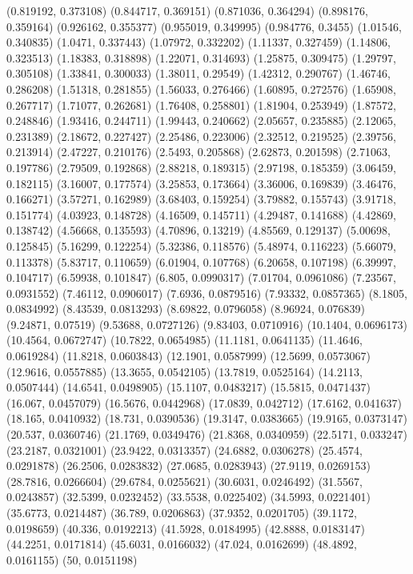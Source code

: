 {(0.819192, 0.373108)
(0.844717, 0.369151)
(0.871036, 0.364294)
(0.898176, 0.359164)
(0.926162, 0.355377)
(0.955019, 0.349995)
(0.984776, 0.3455)
(1.01546, 0.340835)
(1.0471, 0.337443)
(1.07972, 0.332202)
(1.11337, 0.327459)
(1.14806, 0.323513)
(1.18383, 0.318898)
(1.22071, 0.314693)
(1.25875, 0.309475)
(1.29797, 0.305108)
(1.33841, 0.300033)
(1.38011, 0.29549)
(1.42312, 0.290767)
(1.46746, 0.286208)
(1.51318, 0.281855)
(1.56033, 0.276466)
(1.60895, 0.272576)
(1.65908, 0.267717)
(1.71077, 0.262681)
(1.76408, 0.258801)
(1.81904, 0.253949)
(1.87572, 0.248846)
(1.93416, 0.244711)
(1.99443, 0.240662)
(2.05657, 0.235885)
(2.12065, 0.231389)
(2.18672, 0.227427)
(2.25486, 0.223006)
(2.32512, 0.219525)
(2.39756, 0.213914)
(2.47227, 0.210176)
(2.5493, 0.205868)
(2.62873, 0.201598)
(2.71063, 0.197786)
(2.79509, 0.192868)
(2.88218, 0.189315)
(2.97198, 0.185359)
(3.06459, 0.182115)
(3.16007, 0.177574)
(3.25853, 0.173664)
(3.36006, 0.169839)
(3.46476, 0.166271)
(3.57271, 0.162989)
(3.68403, 0.159254)
(3.79882, 0.155743)
(3.91718, 0.151774)
(4.03923, 0.148728)
(4.16509, 0.145711)
(4.29487, 0.141688)
(4.42869, 0.138742)
(4.56668, 0.135593)
(4.70896, 0.13219)
(4.85569, 0.129137)
(5.00698, 0.125845)
(5.16299, 0.122254)
(5.32386, 0.118576)
(5.48974, 0.116223)
(5.66079, 0.113378)
(5.83717, 0.110659)
(6.01904, 0.107768)
(6.20658, 0.107198)
(6.39997, 0.104717)
(6.59938, 0.101847)
(6.805, 0.0990317)
(7.01704, 0.0961086)
(7.23567, 0.0931552)
(7.46112, 0.0906017)
(7.6936, 0.0879516)
(7.93332, 0.0857365)
(8.1805, 0.0834992)
(8.43539, 0.0813293)
(8.69822, 0.0796058)
(8.96924, 0.076839)
(9.24871, 0.07519)
(9.53688, 0.0727126)
(9.83403, 0.0710916)
(10.1404, 0.0696173)
(10.4564, 0.0672747)
(10.7822, 0.0654985)
(11.1181, 0.0641135)
(11.4646, 0.0619284)
(11.8218, 0.0603843)
(12.1901, 0.0587999)
(12.5699, 0.0573067)
(12.9616, 0.0557885)
(13.3655, 0.0542105)
(13.7819, 0.0525164)
(14.2113, 0.0507444)
(14.6541, 0.0498905)
(15.1107, 0.0483217)
(15.5815, 0.0471437)
(16.067, 0.0457079)
(16.5676, 0.0442968)
(17.0839, 0.042712)
(17.6162, 0.041637)
(18.165, 0.0410932)
(18.731, 0.0390536)
(19.3147, 0.0383665)
(19.9165, 0.0373147)
(20.537, 0.0360746)
(21.1769, 0.0349476)
(21.8368, 0.0340959)
(22.5171, 0.033247)
(23.2187, 0.0321001)
(23.9422, 0.0313357)
(24.6882, 0.0306278)
(25.4574, 0.0291878)
(26.2506, 0.0283832)
(27.0685, 0.0283943)
(27.9119, 0.0269153)
(28.7816, 0.0266604)
(29.6784, 0.0255621)
(30.6031, 0.0246492)
(31.5567, 0.0243857)
(32.5399, 0.0232452)
(33.5538, 0.0225402)
(34.5993, 0.0221401)
(35.6773, 0.0214487)
(36.789, 0.0206863)
(37.9352, 0.0201705)
(39.1172, 0.0198659)
(40.336, 0.0192213)
(41.5928, 0.0184995)
(42.8888, 0.0183147)
(44.2251, 0.0171814)
(45.6031, 0.0166032)
(47.024, 0.0162699)
(48.4892, 0.0161155)
(50, 0.0151198)
}


